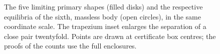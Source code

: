 \documentclass[11pt]{article}
\begin{document}
\begin{figure}[htbp]
\begin{picture}
\end{picture}
\endgroup
\caption{The five limiting primary shapes (filled disks) and the respective equilibria of the sixth, massless body (open circles), in the same coordinate scale. The trapezium inset enlarges the separation of a close pair twentyfold. Points are drawn at certificate box centres; the proofs of the counts use the full enclosures.}\label{fig:five}
\end{figure}
\end{document}
